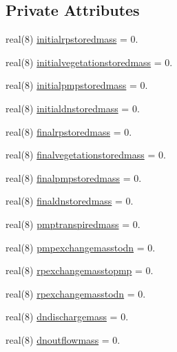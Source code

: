 \subsection*{Private Attributes}
\begin{DoxyCompactItemize}
\item 
real(8) \mbox{\hyperlink{structmodulebasin_1_1t__propmassbalance_a09ad8e5f52f579c84898447abecd8fdc}{initialrpstoredmass}} = 0.
\item 
real(8) \mbox{\hyperlink{structmodulebasin_1_1t__propmassbalance_a55470f23639ba47a09ff192842976b29}{initialvegetationstoredmass}} = 0.
\item 
real(8) \mbox{\hyperlink{structmodulebasin_1_1t__propmassbalance_a58a1ad509a1b9e061b8778de8eaab559}{initialpmpstoredmass}} = 0.
\item 
real(8) \mbox{\hyperlink{structmodulebasin_1_1t__propmassbalance_a8359ee10438082c9fdcc621286caf39b}{initialdnstoredmass}} = 0.
\item 
real(8) \mbox{\hyperlink{structmodulebasin_1_1t__propmassbalance_a0339a4295e914e9b7c00efa48343afa0}{finalrpstoredmass}} = 0.
\item 
real(8) \mbox{\hyperlink{structmodulebasin_1_1t__propmassbalance_a547473f044f38307be966bab5e97030d}{finalvegetationstoredmass}} = 0.
\item 
real(8) \mbox{\hyperlink{structmodulebasin_1_1t__propmassbalance_a15c5ef8133679bd97d0e0d64bdd5ff07}{finalpmpstoredmass}} = 0.
\item 
real(8) \mbox{\hyperlink{structmodulebasin_1_1t__propmassbalance_a1712ceba05fdc073641ce332d709575e}{finaldnstoredmass}} = 0.
\item 
real(8) \mbox{\hyperlink{structmodulebasin_1_1t__propmassbalance_af09c49a81ca9658b89cbea93b14d3101}{pmptranspiredmass}} = 0.
\item 
real(8) \mbox{\hyperlink{structmodulebasin_1_1t__propmassbalance_ad13c73e2d127d332e7b31a74b837e346}{pmpexchangemasstodn}} = 0.
\item 
real(8) \mbox{\hyperlink{structmodulebasin_1_1t__propmassbalance_aa32851a2f5caa47cf91b605ebdb9ed99}{rpexchangemasstopmp}} = 0.
\item 
real(8) \mbox{\hyperlink{structmodulebasin_1_1t__propmassbalance_a629ae04cebd0668cee9ac1f0aa96e5ce}{rpexchangemasstodn}} = 0.
\item 
real(8) \mbox{\hyperlink{structmodulebasin_1_1t__propmassbalance_af9fede2785055e3bc97dc5bfbb8860ac}{dndischargemass}} = 0.
\item 
real(8) \mbox{\hyperlink{structmodulebasin_1_1t__propmassbalance_a81d7c47e8ada9fe229416026e98482a9}{dnoutflowmass}} = 0.

\end{DoxyCompactItemize}
